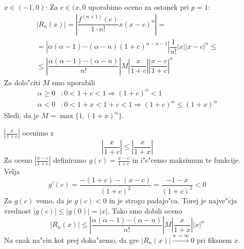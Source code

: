 \begin{enumerate}
\begin{itemize}
        \item[$x \in (-1, 0)$:] Za $c \in (x, 0$ uporabimo oceno za ostanek pri $p = 1$:
        \begin{multline*}
         |R_n(x)| = \left| \dfrac{f^{(n+1)} (c)}{1 \cdot n!} x (x-c)^n \right| = \\
         = \left| \alpha (\alpha - 1) \cdots (\alpha -n) (1+c)^{\alpha -n -1} \right| \dfrac{1}{n!} |x| |x-c|^n \leq \\
         \leq \left| \dfrac{\alpha (\alpha - 1) \cdots (\alpha - n)}{n!} \right| M \left| \dfrac{x}{1+c} \right| \left| \dfrac{x-c}{1+c} \right|^n
        \end{multline*}
        Za dolo"citi $M$ smo uporabili
        \begin{align*}
        \alpha \geq 0&: 0 < 1 + c < 1 \Rightarrow (1 + c)^\alpha < 1\\
        \alpha < 0 &: 0 < 1 + x < 1 + c < 1 \Rightarrow (1+c)^\alpha \leq (1 + x)^\alpha
        \end{align*}
        Sledi, da je $M = \max \{ 1, (1+x)^\alpha \}$.
        
        $\left| \frac{x}{1+c} \right|$ ocenimo z
        \begin{equation*}
        \left| \dfrac{x}{1+c} \right| \leq \left| \dfrac{x}{1+x} \right|
        \end{equation*}
        Za oceno $\left| \frac{x - c}{1+c} \right|$ definiramo $g(c) = \frac{x - c}{1 + c}$ in i"s"cemo maksimum te funkcije. Velja
        \begin{equation*}
        g'(c) = \dfrac{-(1+c) - (x - c)}{(1+c)^2} = \dfrac{-1 - x}{(1 + c)^2} < 0
        \end{equation*}
       Za $g(c)$ vemo, da je $g(c) < 0$ in je strogo padajo"ca. Torej je najve"cja vrednost $|g(c)| \leq |g(0)| = |x|$. Tako smo dobili oceno
       \begin{equation*}
       |R_n(x)| \leq \left| \dfrac{\alpha (\alpha - 1) \cdots (\alpha - n)}{n!} \right| M \left| \dfrac{x}{1+x} \right| |x|^n
       \end{equation*}
       Na enak na"cin kot prej doka"zemo, da gre $|R_n(x)| \stackrel{n \to \infty}{\longrightarrow} 0$ pri fiksnem $x$.
    \end{itemize}
\end{enumerate}